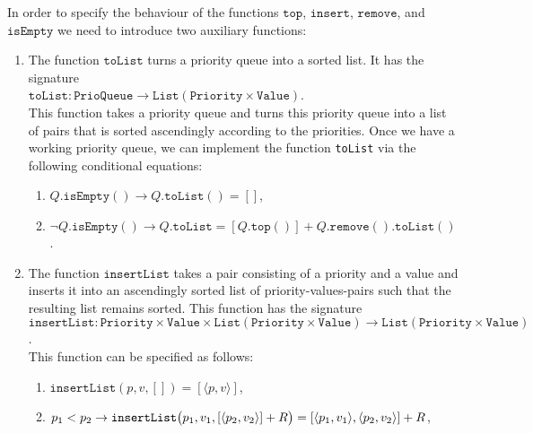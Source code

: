 \begin{Definition}
\begin{enumerate}
      In order to specify the behaviour of the functions $\texttt{top}$, $\texttt{insert}$, $\texttt{remove}$,
      and $\texttt{isEmpty}$ we need to introduce two auxiliary functions:  
      \begin{enumerate}
      \item The function $\texttt{toList}$ turns a priority queue into a sorted list.  It has the signature
            \\[0.2cm]
            \hspace*{1.3cm}
            $\texttt{toList}: \texttt{PrioQueue} \rightarrow \texttt{List}(\texttt{Priority} \times \texttt{Value})$.
            \\[0.2cm]
            This function takes a priority queue and turns this priority queue into a list of pairs that is
            sorted ascendingly according to the priorities. Once we have a working priority queue, we can
            implement the function \texttt{toList} via the following conditional equations: 
            \begin{enumerate}
            \item $Q.\texttt{isEmpty}() \rightarrow Q.\texttt{toList}() = []$,
            \item $\neg Q.\texttt{isEmpty}() \rightarrow Q.\texttt{toList} = [Q.\texttt{top}()] + Q.\texttt{remove}().\texttt{toList}()$.
            \end{enumerate}
      \item The function $\texttt{insertList}$ takes a pair consisting of a priority and a value and inserts it
            into an ascendingly sorted list of priority-values-pairs such that the resulting list remains
            sorted.  This function has the signature
            \\[0.2cm]
            \hspace*{-0.5cm}
            $\mathtt{insertList}: \mathtt{Priority} \times \mathtt{Value} \times \mathtt{List}(\mathtt{Priority} \times \mathtt{Value}) 
             \rightarrow \mathtt{List}(\mathtt{Priority} \times \mathtt{Value})
            $.
            \\[0.2cm]
            This function can be specified as follows:
            \begin{enumerate}
            \item $\texttt{insertList}(p,v,[]) = [\langle p,v\rangle ]$,
            \item $p_1 <    p_2 \rightarrow \texttt{insertList}\bigl(p_1,v_1,[\pair(p_2,v_2)] + R\bigr) = [\pair(p_1,v_1), \pair(p_2,v_2)] + R$,

\end{enumerate}
\end{enumerate}
\end{enumerate}
\end{Definition}
